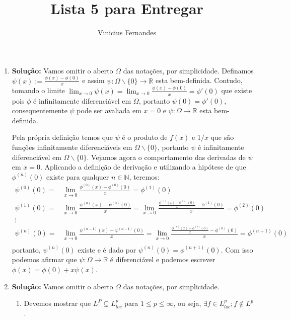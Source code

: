 \documentclass{article}
\begin{document}
	
	\title{Lista 5 para Entregar}
	\author{Vinicius Fernandes}
	
	\maketitle
	
	\begin{enumerate}
		
		\item \textbf{Solução:} Vamos omitir o aberto $\Omega$ das notações, por simplicidade. Definamos $\psi(x) := \frac{\phi(x) - \phi(0)}{x}$ e assim $\psi:\Omega\backslash\{0\} \to \mathbb{R}$ esta bem-definida. Contudo, tomando o limite $\lim_{x \to 0} \psi(x) = \lim_{x \to 0} \frac{\phi(x) - \phi(0)}{x} = \phi'(0)$ que existe pois $\phi$ é infinitamente diferenciável em $\Omega$, portanto $\psi(0) = \phi'(0)$, consequentemente $\psi$ pode ser avaliada em $x=0$ e $\psi:\Omega \to \mathbb{R}$ esta bem-definida. 
		
		Pela própria definição temos que $\psi$ é o produto de $f(x)$ e $1/x$ que são funções infinitamente diferenciáveis em $\Omega \backslash\{0\}$, portanto $\psi$ é infinitamente diferenciável em $\Omega \backslash\{0\}$. Vejamos agora o comportamento das derivadas de $\psi$ em $x=0$. Aplicando a definição de derivação e utilizando a hipótese de que $\phi^{(n)}(0)$ existe para qualquer $n \in \mathbb{N}$, teremos:
		$$
		\begin{aligned}
		\psi^{(0)}(0) 
		= & \lim_{x \to 0}\frac{\phi^{(0)}(x) - \phi^{(0)}(0)}{x} = \phi^{(1)}(0) \\
		\psi^{(1)}(0) 
		= & \lim_{x \to 0}\frac{\psi^{(0)}(x) - \psi^{(0)}(0)}{x} = \lim_{x \to 0}\frac{\frac{\phi^{(1)}(x) - \phi^{(1)}(0)}{x} - \phi^{(1)}(0)}{x} = \phi^{(2)}(0) \\
		\vdots & \\
		\psi^{(n)}(0) 
		= & \lim_{x \to 0}\frac{\psi^{(n-1)}(x) - \psi^{(n-1)}(0)}{x} = \lim_{x \to 0}\frac{\frac{\phi^{(n)}(x) - \phi^{(n)}(0)}{x} - \phi^{(n)}(0)}{x} = \phi^{(n+1)}(0) \\
		\end{aligned}
		$$
		portanto, $\psi^{(n)}(0)$ existe e é dado por $\psi^{(n)}(0) = \phi^{(n+1)}(0)$. Com isso podemos afirmar que $\psi:\Omega \to \mathbb{R}$ é diferenciável e podemos escrever $\phi(x) = \phi(0) + x \psi(x)$.
		
		
		\item \textbf{Solução:} Vamos omitir o aberto $\Omega$ das notações, por simplicidade.
		\begin{enumerate}
			\item Devemos mostrar que $L^{P} \subsetneq L^{p}_{loc}$ para $1 \leq p \leq \infty$, ou seja, $\exists f \in L^{p}_{loc}; f \notin L^{p}$. 
			

\end{enumerate}
\end{enumerate}
\end{document}
